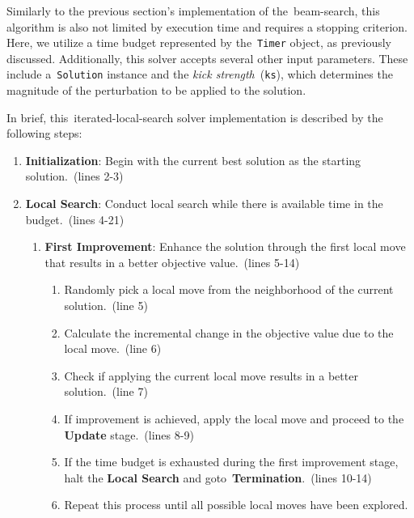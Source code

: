 Similarly to the previous section's implementation of the~\acrshort{beam-search},
this algorithm is also not limited by execution time and requires a stopping
criterion. Here, we utilize a time budget represented by the~\texttt{Timer}
object, as previously discussed. Additionally, this solver accepts several other
input parameters. These include a~\texttt{Solution} instance and the
\textit{kick strength}~(\texttt{ks}), which determines the magnitude of the
perturbation to be applied to the solution.



In brief, this~\acrshort{iterated-local-search} solver implementation is
described by the following steps:

\begin{enumerate}
      \item \textbf{Initialization}: Begin with the current best solution as the starting solution.~(lines 2-3)
      \item \textbf{Local Search}: Conduct local search while there is available time in the budget.~(lines 4-21)
            \begin{enumerate}
                  \item \textbf{First Improvement}: Enhance the solution through the first local move that results in
                        a better objective value.~(lines 5-14)
                        \begin{enumerate}
                              \item Randomly pick a local move from the neighborhood of the current solution.~(line 5)
                              \item Calculate the incremental change in the objective value due to the local move.~(line 6)
                              \item Check if applying the current local move results in a better solution.~(line 7)
                              \item If improvement is achieved, apply the local move and proceed to the \textbf{Update} stage.~(lines 8-9)
                              \item If the time budget is exhausted during the first improvement stage, halt the \textbf{Local Search}
                                    and goto~\textbf{Termination}.~(lines 10-14)
                              \item Repeat this process until all possible local moves have been explored.

\end{enumerate}
\end{enumerate}
\end{enumerate}
